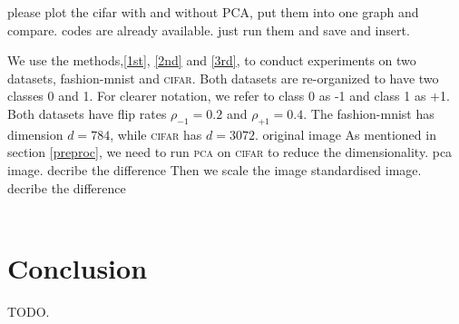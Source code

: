 \documentclass[12pt]{article} %
\newcommand{\rhoo}{\rho_{+1}}
\newcommand{\rhoz}{\rho_{-1}}
\begin{document}
{\color{red} please plot the cifar with and without PCA, put them into one graph and compare. codes are already available. just run them and save and insert.}

We use the methods,\ref{1st}, \ref{2nd} and \ref{3rd}, to conduct experiments on two datasets, fashion-mnist and \textsc{cifar}.
Both datasets are re-organized to have two classes 0 and 1. 
For clearer notation, we refer to class 0 as -1 and class 1 as +1. 
Both datasets have flip rates $\rhoz=0.2$ and $\rhoo=0.4$.
The fashion-mnist has dimension $d=784$, while \textsc{cifar} has $d=3072$. 
{\color{red} original image}
As mentioned in section \ref{preproc}, we need to run \textsc{pca} on \textsc{cifar} to reduce the dimensionality.
{\color{red} pca image. decribe the difference}
Then we scale the image
{\color{red} standardised image. decribe the difference} \\ \\


\section{Conclusion}
{\color{red} TODO.}\\

\label{headings}





\end{document}
